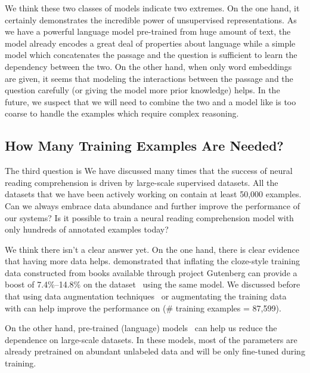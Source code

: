 We think these two classes of models indicate two extremes. On the one hand, it certainly demonstrates the incredible power of unsupervised representations. As we have a powerful language model pre-trained from huge amount of text, the model already encodes a great deal of properties about language while a simple model which concatenates the passage and the question is sufficient to learn the dependency between the two. On the other hand, when only word embeddings are given, it seems that modeling the interactions between the passage and the question carefully (or giving the model more prior knowledge)  helps. In the future, we suspect that we will need to combine the two and a model like  is too coarse to handle the examples which require complex reasoning.


\subsection{How Many Training Examples Are Needed?}
The third question is  We have discussed many times that the success of neural reading comprehension is driven by large-scale supervised datasets. All the datasets that we have been actively working on contain at least 50,000 examples. Can we always embrace data abundance and further improve the performance of our systems? Is it possible to train a neural reading comprehension model with only hundreds of annotated examples today?

We think there isn't a clear answer yet. On the one hand, there is clear evidence that having more data helps.  demonstrated that inflating the cloze-style training data constructed from books available through project Gutenberg can provide a boost of 7.4\%--14.8\% on the  dataset~\cite{hill2016goldilocks} using the same model. We discussed before that using data augmentation techniques~\cite{yu2018qanet} or augmentating the training data with  can help improve the performance on  (\# training examples = 87,599).

On the other hand, pre-trained (language) models~\cite{radford2018improving,devlin2018bert} can help us reduce the dependence on large-scale datasets. In these models, most of the parameters are already pretrained on abundant unlabeled data and will be only fine-tuned during training.

